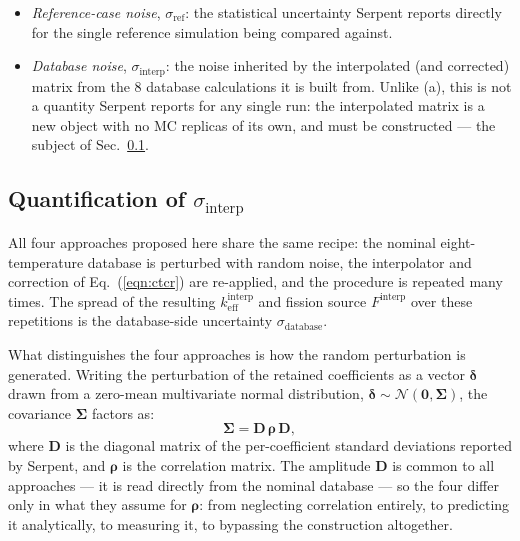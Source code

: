 \documentclass{style/nseJournal}
\begin{document}
\begin{itemize}
  \item[(a)] \emph{Reference-case noise}, $\sigma_{\text{ref}}$: the statistical uncertainty Serpent reports directly for the single reference simulation being compared against. 
  
  \item[(b)] \emph{Database noise}, $\sigma_{\text{interp}}$: the noise inherited by the interpolated (and corrected) matrix from the 8 database calculations it is built from. Unlike (a), this is not a quantity Serpent reports for any single run: the interpolated matrix is a new object with no MC replicas of its own, and must be constructed --- the subject of Sec.~\ref{sec:four_methods}.
\end{itemize}

\subsection{Quantification of $\sigma_{\text{interp}}$ }
\label{sec:four_methods}

All four approaches proposed here share the same recipe: the nominal eight-temperature database is perturbed with random noise, the interpolator and correction of Eq.~(\ref{eqn:ctcr}) are re-applied, and the procedure is repeated many times. The spread of the resulting $k_{\text{eff}}^{\text{interp}}$ and fission source $F^{\text{interp}}$ over these repetitions is the database-side uncertainty $\sigma_{\text{database}}$.

What distinguishes the four approaches is how the random perturbation is generated. Writing the perturbation of the retained coefficients as a vector $\boldsymbol\delta$ drawn from a zero-mean multivariate normal distribution, $\boldsymbol\delta\sim\mathcal{N}(\mathbf{0},\boldsymbol\Sigma)$, the covariance $\boldsymbol\Sigma$ factors as:
\begin{equation}
  \boldsymbol\Sigma = \mathbf{D}\,\boldsymbol\rho\,\mathbf{D},
  \label{eqn:sigma_factor}
\end{equation}
where $\mathbf{D}$ is the diagonal matrix of the per-coefficient standard deviations reported by Serpent, and $\boldsymbol\rho$ is the correlation matrix. The amplitude $\mathbf{D}$ is common to all approaches --- it is read directly from the nominal database --- so the four differ only in what they assume for $\boldsymbol\rho$: from neglecting correlation entirely, to predicting it analytically, to measuring it, to bypassing the construction altogether.
\end{document}
